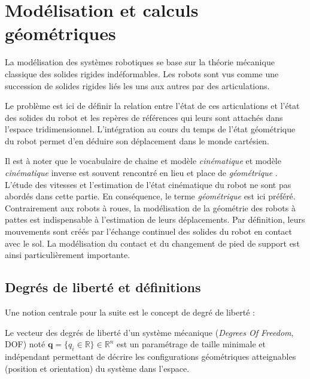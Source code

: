 
\section{Modélisation et calculs géométriques\label{sec:model_geometric}}

La modélisation des systèmes robotiques
se base sur la théorie mécanique classique des solides
rigides indéformables.
Les robots sont vus comme une succession de solides rigides 
liés les uns aux autres par des articulations.

Le problème est ici de définir la relation entre 
l'état de ces articulations et l'état des solides du robot et 
les repères de références qui leurs sont attachés 
dans l'espace tridimensionnel.
L'intégration au cours du temps de l'état géométrique du robot 
permet d'en déduire son déplacement dans le monde cartésien.

Il est à noter que le vocabulaire de \og chaine et 
modèle \textit{cinématique} \fg et \og modèle \textit{cinématique} 
inverse \fg est souvent rencontré en lieu et place 
de \og \textit{géométrique} \fg.
L'étude des vitesses et l'estimation de l'état cinématique du robot 
ne sont pas abordés dans cette partie. 
En conséquence, le terme \og \textit{géométrique} \fg est ici préféré.\\

Contrairement aux robots à roues, la modélisation de la géométrie
des robots à pattes est indispensable à l'estimation de leurs déplacements.
Par définition, leurs mouvements sont créés par l'échange 
continuel des solides du robot en contact avec le sol.
La modélisation du contact et du changement de pied de support 
est ainsi particulièrement importante.

\subsection{Degrés de liberté et définitions}

Une notion centrale pour la suite est le concept de degré de liberté :

\begin{definition}
    Le vecteur des degrés de liberté d'un système mécanique (\textit{Degrees Of Freedom}, DOF)
    noté $\bm{q} = \{q_i \in \mathbb{R}\} \in \mathbb{R}^n$ est un paramétrage de taille minimale
    et indépendant permettant de décrire les configurations géométriques atteignables
    (position et orientation) du système dans l'espace.
\end{definition}


